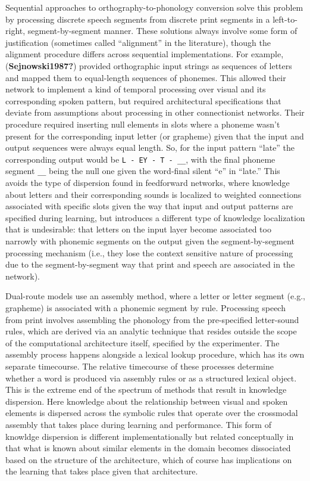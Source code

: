 \documentclass[
  american,
  man,floatsintext]{apa6}
\begin{document}
Sequential approaches to orthography-to-phonology conversion solve this problem by processing discrete speech segments from discrete print segments in a left-to-right, segment-by-segment manner. These solutions always involve some form of justification (sometimes called ``alignment'' in the literature), though the alignment procedure differs across sequential implementations. For example, (\textbf{Sejnowski1987?}) provided orthographic input strings as sequences of letters and mapped them to equal-length sequences of phonemes. This allowed their network to implement a kind of temporal processing over visual and its corresponding spoken pattern, but required architectural specifications that deviate from assumptions about processing in other connectionist networks. Their procedure required inserting null elements in slots where a phoneme wasn't present for the corresponding input letter (or grapheme) given that the input and output sequences were always equal length. So, for the input pattern ``late'' the corresponding output would be \texttt{L\ -\ EY\ -\ T\ -\ \_\_}, with the final phoneme segment \texttt{\_\_} being the null one given the word-final silent ``e'' in ``late.'' This avoids the type of dispersion found in feedforward networks, where knowledge about letters and their corresponding sounds is localized to weighted connections associated with specific slots given the way that input and output patterns are specified during learning, but introduces a different type of knowledge localization that is undesirable: that letters on the input layer become associated too narrowly with phonemic segments on the output given the segment-by-segment processing mechanism (i.e., they lose the context sensitive nature of processing due to the segment-by-segment way that print and speech are associated in the network).

Dual-route models use an assembly method, where a letter or letter segment (e.g., grapheme) is associated with a phonemic segment by rule. Processing speech from print involves assembling the phonology from the pre-specified letter-sound rules, which are derived via an analytic technique that resides outside the scope of the computational architecture itself, specified by the experimenter. The assembly process happens alongside a lexical lookup procedure, which has its own separate timecourse. The relative timecourse of these processes determine whether a word is produced via assembly rules or as a structured lexical object. This is the extreme end of the spectrum of methods that result in knowledge dispersion. Here knowledge about the relationship between visual and spoken elements is dispersed across the symbolic rules that operate over the crossmodal assembly that takes place during learning and performance. This form of knowldge dispersion is different implementationally but related conceptually in that what is known about similar elements in the domain becomes dissociated based on the structure of the architecture, which of course has implications on the learning that takes place given that architecture.
\end{document}

